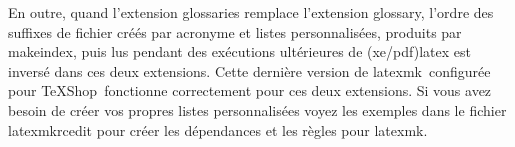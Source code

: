 \documentclass[11pt,french]{article}
\newcommand{\MacTeX}{Mac\kern-.13em\TeX}
\newcommand{\TS}{\textsf{\TeX Shop}}
\newcommand{\latexmk}{\textsf{latexmk}}
\newcommand{\cmd}[1]{\textsf{#1}}
\begin{document}
En outre, quand l'extension \cmd{glossaries} remplace l'extension \cmd{glossary}, l'ordre des suffixes de fichier créés par acronyme et listes personnalisées, produits par \cmd{makeindex}, puis lus pendant des exécutions ultérieures de (\cmd{xe/pdf)latex} est inversé dans ces deux extensions. Cette dernière version de \latexmk\ configurée pour \TS\ fonctionne correctement pour ces deux extensions. Si vous avez besoin de créer vos propres listes personnalisées voyez les exemples dans le fichier \cmd{latexmkrcedit} pour créer les dépendances et les règles pour \latexmk.%

%
%
%
%
\end{document}
